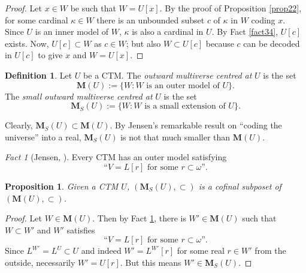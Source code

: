 \documentclass[12pt, twoside]{memoir}
\numberwithin{equation}{section}
\newtheorem{prop}[thm]{Proposition}
\theoremstyle{definition}
\newtheorem{defi}[thm]{Definition}
\theoremstyle{remark}
\newtheorem{fact}[thm]{Fact}
\theoremstyle{definition}
\theoremstyle{definition}
\theoremstyle{definition}
\theoremstyle{remark}
\begin{document}
\begin{proof}
Let $x \in W$ be such that $W = U[x]$. By the proof of Proposition \ref{prop22}, for some cardinal $\kappa \in W$ there is an unbounded subset $c$ of $\kappa$ in $W$ coding $x$. Since $U$ is an inner model of $W$, $\kappa$ is also a cardinal in $U$. By Fact \ref{fact34}, $U[c]$ exists. Now, $U[c] \subset W$ as $c \in W$; but also $W \subset U[c]$ because $c$ can be decoded in $U[c]$ to give $x$ and $W = U[x]$.
\end{proof}

\begin{defi}
Let $U$ be a CTM. The \emph{outward multiverse centred at} $U$ is the set
\begin{equation*}
    \mathbf{M}(U) := \{W : W \text{ is an outer model of } U\} \text{.}
\end{equation*}
The \emph{small outward multiverse centred at} $U$ is the set
\begin{equation*}
    \mathbf{M}_{S}(U) := \{W : W \text{ is a small extension of } U\} \text{.}
\end{equation*}
\end{defi}

Clearly, $\mathbf{M}_{S}(U) \subset \mathbf{M}(U)$. By Jensen's remarkable result on ``coding the universe'' into a real, $\mathbf{M}_{S}(U)$ is not that much smaller than $\mathbf{M}(U)$.

\begin{fact}[Jensen, \cite{jensencoding}]\label{fact37}
Every CTM has an outer model satisfying 
\begin{equation*}
    \text{``} V = L[r] \text{ for some } r \subset \omega \text{''.}
\end{equation*}
\end{fact}

\begin{prop}
Given a CTM $U$, $(\mathbf{M}_{S}(U), \subset)$ is a cofinal subposet of $(\mathbf{M}(U), \subset)$.
\end{prop}

\begin{proof}
Let $W \in \mathbf{M}(U)$. Then by Fact \ref{fact37}, there is $W' \in \mathbf{M}(U)$ such that $W \subset W'$ and $W'$ satisfies
\begin{equation*}
    \text{``} V = L[r] \text{ for some } r \subset \omega \text{''.}
\end{equation*}
Since $L^{W'} = L^U \subset U$ and indeed $W' = L^{W'}[r]$ for some real $r \in W'$ from the outside, necessarily $W' = U[r]$. But this means $W' \in \mathbf{M}_{S}(U)$.
\end{proof}
\end{document}
